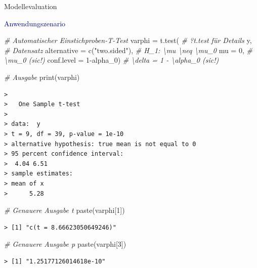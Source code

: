 \documentclass[
  8pt,
  ignorenonframetext,
]{beamer}
\newenvironment{Shaded}{\begin{snugshade}}{\end{snugshade}}
\newcommand{\AttributeTok}[1]{\textcolor[rgb]{0.77,0.63,0.00}{#1}}
\newcommand{\CommentTok}[1]{\textcolor[rgb]{0.56,0.35,0.01}{\textit{#1}}}
\newcommand{\DecValTok}[1]{\textcolor[rgb]{0.00,0.00,0.81}{#1}}
\newcommand{\FunctionTok}[1]{\textcolor[rgb]{0.00,0.00,0.00}{#1}}
\newcommand{\NormalTok}[1]{#1}
\newcommand{\OtherTok}[1]{\textcolor[rgb]{0.56,0.35,0.01}{#1}}
\newcommand{\SpecialCharTok}[1]{\textcolor[rgb]{0.00,0.00,0.00}{#1}}
\newcommand{\StringTok}[1]{\textcolor[rgb]{0.31,0.60,0.02}{#1}}
\begin{document}
\begin{frame}[fragile]{Modellevaluation}
\protect\hypertarget{modellevaluation-18}{}
\small

\textcolor{darkblue}{Anwendungszenario} \vspace{2mm}

\tiny

\begin{Shaded}
\begin{Highlighting}[]
\CommentTok{\# Automatischer Einstichproben{-}T{-}Test}
\NormalTok{varphi    }\OtherTok{=} \FunctionTok{t.test}\NormalTok{(                           }\CommentTok{\# ?t.test für Details}
\NormalTok{            y,                                }\CommentTok{\# Datensatz}
            \AttributeTok{alternative =} \FunctionTok{c}\NormalTok{(}\StringTok{"two.sided"}\NormalTok{),     }\CommentTok{\# H\_1: \textbackslash{}mu \textbackslash{}neq \textbackslash{}mu\_0}
            \AttributeTok{mu          =} \DecValTok{0}\NormalTok{,                  }\CommentTok{\# \textbackslash{}mu\_0 (sic!)}
            \AttributeTok{conf.level  =} \DecValTok{1}\SpecialCharTok{{-}}\NormalTok{alpha\_0)          }\CommentTok{\# \textbackslash{}delta = 1 {-} \textbackslash{}alpha\_0 (sic!)}

\CommentTok{\# Ausgabe}
\FunctionTok{print}\NormalTok{(varphi)}
\end{Highlighting}
\end{Shaded}

\begin{verbatim}
> 
>   One Sample t-test
> 
> data:  y
> t = 9, df = 39, p-value = 1e-10
> alternative hypothesis: true mean is not equal to 0
> 95 percent confidence interval:
>  4.04 6.51
> sample estimates:
> mean of x 
>      5.28
\end{verbatim}

\begin{Shaded}
\begin{Highlighting}[]
\CommentTok{\# Genauere Ausgabe t}
\FunctionTok{paste}\NormalTok{(varphi[}\DecValTok{1}\NormalTok{])}
\end{Highlighting}
\end{Shaded}

\begin{verbatim}
> [1] "c(t = 8.66623050649246)"
\end{verbatim}

\begin{Shaded}
\begin{Highlighting}[]
\CommentTok{\# Genauere Ausgabe p}
\FunctionTok{paste}\NormalTok{(varphi[}\DecValTok{3}\NormalTok{])}
\end{Highlighting}
\end{Shaded}

\begin{verbatim}
> [1] "1.25177126014618e-10"
\end{verbatim}
\end{frame}
\end{document}
